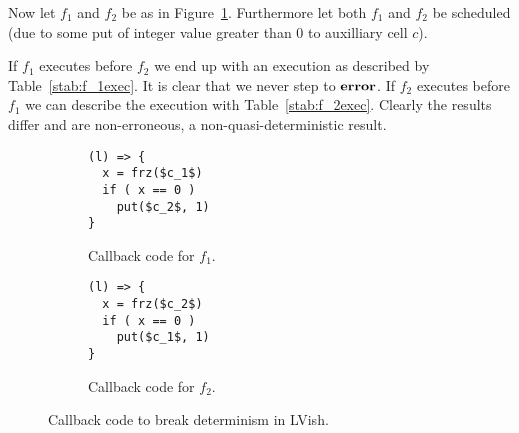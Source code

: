 Now let $f_1$ and $f_2$ be as in Figure~\ref{fig:lvish_fun_breaking}.
Furthermore let both $f_1$ and $f_2$ be scheduled (due to some put of integer
value greater than $0$ to auxilliary cell $c$).

If $f_1$ executes before $f_2$ we end up with an execution as described by
Table~\ref{stab:f_1exec}. It is clear that we never step to $\mbox{{\bf error}}$.
If $f_2$ executes before $f_1$ we can describe the execution with
Table~\ref{stab:f_2exec}. Clearly the results differ and are non-erroneous, a
non-quasi-deterministic result.

\begin{figure}
  \centering
  \begin{subfigure}[t]{0.4\textwidth}
    \begin{lstlisting}[mathescape=true]
(l) => {
  x = frz($c_1$)
  if ( x == 0 )
    put($c_2$, 1)
}
    \end{lstlisting}
    \caption{Callback code for $f_1$.}
  \end{subfigure}
  \quad
  \begin{subfigure}[t]{0.4\textwidth}
    \begin{lstlisting}[mathescape=true]
(l) => {
  x = frz($c_2$)
  if ( x == 0 )
    put($c_1$, 1)
}
    \end{lstlisting}
    \caption{Callback code for $f_2$.}
  \end{subfigure}
  \caption{Callback code to break determinism in LVish.}
  \label{fig:lvish_fun_breaking}
\end{figure}

